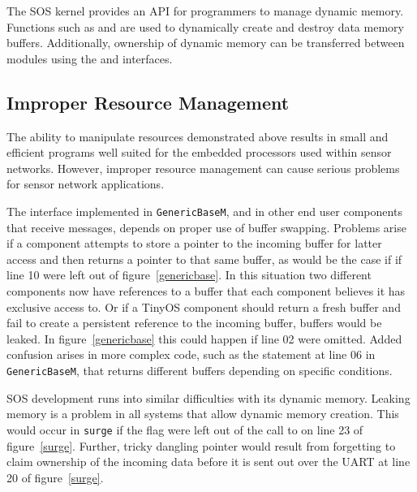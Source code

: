The SOS kernel provides an API for programmers to manage dynamic
memory.  
Functions such as  and  are used to
dynamically create and destroy data memory buffers.  Additionally,
ownership of dynamic memory can be transferred between modules using
the  and  interfaces.




\subsection{Improper Resource Management}

The ability to manipulate resources demonstrated above results in
small and efficient programs well suited for the embedded processors
used within sensor networks.  However, improper resource management
can cause serious problems for sensor network applications.


\smallskip{}

The  interface implemented in {\tt GenericBaseM}, and in
other end user components that receive messages, depends on proper use
of buffer swapping.  Problems arise if a component attempts to store a
pointer to the incoming buffer for latter access and then returns a
pointer to that same buffer, as would be the case if if line 10 were
left out of figure~\ref{genericbase}.  In this situation two different
components now have references to a buffer that each component believes
it has exclusive access to.  Or if a TinyOS component should return a
fresh buffer and fail to create a persistent reference to the incoming
buffer, buffers would be leaked.  In figure~\ref{genericbase} this
could happen if line 02 were omitted.  Added confusion arises in
more complex code, such as the  statement at line 06 in {\tt
GenericBaseM}, that returns different buffers depending on specific
conditions. 


\smallskip{}

SOS development runs into similar difficulties with its dynamic
memory.  Leaking memory is a problem in all systems that allow dynamic
memory creation.  This would occur in {\tt surge} if the
 flag were left out of the call to
 on line 23 of figure~\ref{surge}.  Further, tricky
dangling pointer would result from forgetting to claim ownership of
the incoming data before it is sent out over the UART at line 20 of
figure~\ref{surge}.


